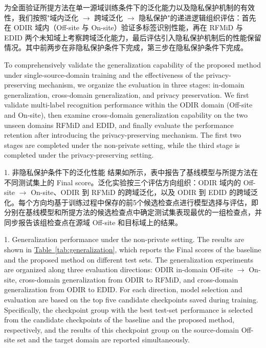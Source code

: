 

为全面验证所提方法在单一源域训练条件下的泛化能力以及隐私保护机制的有效性，我们按照"域内泛化 \(\rightarrow\) 跨域泛化 \(\rightarrow\) 隐私保护"的递进逻辑组织评估：首先在 ODIR 域内（Off-site 与 On-site）验证多标签识别性能，再在 RFMiD 与 EDID 两个未知域上考察跨域泛化能力，最后评估引入隐私保护机制后的性能保留情况。其中前两步在非隐私保护条件下完成，第三步在隐私保护条件下完成。

To comprehensively validate the generalization capability of the proposed method under single-source-domain training and the effectiveness of the privacy-preserving mechanism, we organize the evaluation in three stages: in-domain generalization, cross-domain generalization, and privacy preservation. We first validate multi-label recognition performance within the ODIR domain (Off-site and On-site), then examine cross-domain generalization capability on the two unseen domains RFMiD and EDID, and finally evaluate the performance retention after introducing the privacy-preserving mechanism. The first two stages are completed under the non-private setting, while the third stage is completed under the privacy-preserving setting.


1. 非隐私保护条件下的泛化性能 结果如所示，表中报告了基线模型与所提方法在不同测试集上的 Final score。泛化实验按三个评估方向组织：ODIR 域内的 Off-site \(\rightarrow\) On-site、ODIR 到 RFMiD 的跨域泛化，以及 ODIR 到 EDID 的跨域泛化。每个方向均基于训练过程中保存的前5个候选检查点进行模型选择与评估，即分别在基线模型和所提方法的候选检查点中确定测试集表现最优的一组检查点，并同步报告该组检查点在源域 Off-site 和目标域上的结果。

1. Generalization performance under the non-private setting. The results are shown in \hyperref[tab:generalization]{Table~\ref*{tab:generalization}}, which reports the Final scores of the baseline and the proposed method on different test sets. The generalization experiments are organized along three evaluation directions: ODIR in-domain Off-site \(\rightarrow\) On-site, cross-domain generalization from ODIR to RFMiD, and cross-domain generalization from ODIR to EDID. For each direction, model selection and evaluation are based on the top five candidate checkpoints saved during training. Specifically, the checkpoint group with the best test-set performance is selected from the candidate checkpoints of the baseline and the proposed method, respectively, and the results of this checkpoint group on the source-domain Off-site set and the target domain are reported simultaneously.

